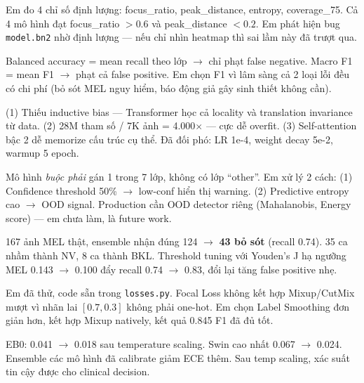 \documentclass[11pt,a4paper]{article}
\begin{document}
\begin{qa}
Em đo 4 chỉ số định lượng: focus\_ratio, peak\_distance, entropy, coverage\_75. Cả 4 mô hình đạt focus\_ratio $> 0.6$ và peak\_distance $< 0.2$. Em phát hiện bug \texttt{model.bn2} nhờ định lượng --- nếu chỉ nhìn heatmap thì sai lầm này đã trượt qua.
\end{qa}

\begin{qa}
Balanced accuracy = mean recall theo lớp $\to$ chỉ phạt false negative. Macro F1 = mean F1 $\to$ phạt cả false positive. Em chọn F1 vì lâm sàng cả 2 loại lỗi đều có chi phí (bỏ sót MEL nguy hiểm, báo động giả gây sinh thiết không cần).
\end{qa}

\begin{qa}
(1) Thiếu inductive bias --- Transformer học cả locality và translation invariance từ data. (2) 28M tham số / 7K ảnh = 4.000$\times$ --- cực dễ overfit. (3) Self-attention bậc 2 dễ memorize cấu trúc cụ thể. Đã đối phó: LR 1e-4, weight decay 5e-2, warmup 5 epoch.
\end{qa}

\begin{qa}
Mô hình \textit{buộc phải} gán 1 trong 7 lớp, không có lớp ``other''. Em xử lý 2 cách: (1) Confidence threshold 50\% $\to$ low-conf hiển thị warning. (2) Predictive entropy cao $\to$ OOD signal. Production cần OOD detector riêng (Mahalanobis, Energy score) --- em chưa làm, là future work.
\end{qa}

\begin{qa}
167 ảnh MEL thật, ensemble nhận đúng 124 $\to$ \textbf{43 bỏ sót} (recall 0.74). 35 ca nhầm thành NV, 8 ca thành BKL. Threshold tuning với Youden's J hạ ngưỡng MEL 0.143 $\to$ 0.100 đẩy recall 0.74 $\to$ 0.83, đổi lại tăng false positive nhẹ.
\end{qa}

\begin{qa}
Em đã thử, code sẵn trong \texttt{losses.py}. Focal Loss không kết hợp Mixup/CutMix mượt vì nhãn lai $[0.7, 0.3]$ không phải one-hot. Em chọn Label Smoothing đơn giản hơn, kết hợp Mixup natively, kết quả 0.845 F1 đã đủ tốt.
\end{qa}

\begin{qa}
EB0: 0.041 $\to$ 0.018 sau temperature scaling. Swin cao nhất 0.067 $\to$ 0.024. Ensemble các mô hình đã calibrate giảm ECE thêm. Sau temp scaling, xác suất tin cậy được cho clinical decision.
\end{qa}
\end{document}
